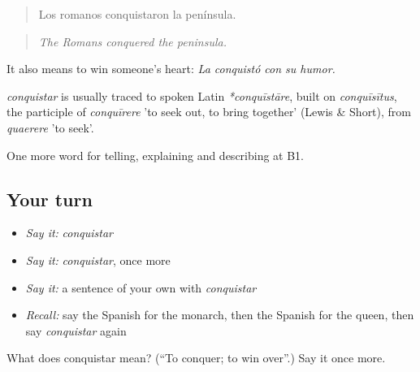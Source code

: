 \begin{quote}
Los romanos conquistaron la península.
\end{quote}

\begin{quote}
\emph{The Romans conquered the peninsula.}
\end{quote}

It also means to win someone's heart: \emph{La conquistó con su humor.}

\begin{cousinweb}
\emph{conquistar} is usually traced to spoken Latin \emph{*conquīstāre}, built on \emph{conquīsītus}, the participle of \emph{conquīrere} 'to seek out, to bring together' (Lewis \& Short), from \emph{quaerere} 'to seek'.
\end{cousinweb}

\begin{grammarlens}[title={What you've built}]
One more word for telling, explaining and describing at B1.
\end{grammarlens}

\subsection*{Your turn}
\begin{itemize}
\raggedright
  \item \emph{Say it:} \emph{conquistar}
  \item \emph{Say it:} \emph{conquistar}, once more
  \item \emph{Say it:} a sentence of your own with \emph{conquistar}
  \item \emph{Recall:} say the Spanish for the monarch, then the Spanish for the queen, then say \emph{conquistar} again
\end{itemize}

\begin{tcolorbox}[breakable,colback=teal!4,colframe=teal!35!black,title={Before you move on}]
What does conquistar mean? (\textquotedblleft{}To conquer; to win over\textquotedblright{}.) Say it once more.
\end{tcolorbox}
